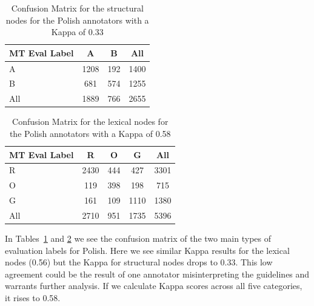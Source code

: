 \documentclass[11pt]{article}
\begin{document}

\begin{table}[h!]
\begin{center}
      \begin{tabular}{|l|cc|c|}
      \hline
\bf{MT Eval Label} & \bf{A} & \bf{B} & \bf{All} \\
\hline                               
    A   & 1208 &  192 & 1400 \\ 
   B   & 681 & 574  & 1255 \\ 
   \hline
   All &  1889 &  766 & 2655 \\
      \hline
    \end{tabular}
\end{center}
\normalsize
\vspace*{-3ex}
\caption{Confusion Matrix for the structural nodes for the Polish annotators with a Kappa of 0.33
}
\label{tab:iaa-ab-pl}
\end{table}

\begin{table}[h!]
\begin{center}
      \begin{tabular}{|l|ccc|c|}
      \hline
\bf{MT Eval Label} & \bf{R} & \bf{O} & \bf{G} & \bf{All} \\
\hline                               
   R   & 2430 &  444 & 427 & 3301 \\ 
   O   & 119 & 398  & 198 & 715 \\ 
   G   & 161 & 109  & 1110 & 1380 \\ 
   \hline
   All &  2710 &  951 & 1735 & 5396 \\
      \hline
    \end{tabular}
\end{center}
\normalsize
\vspace*{-3ex}
\caption{Confusion Matrix for the lexical nodes for the Polish annotators with a Kappa of 0.58
}
\label{tab:iaa-rgo-pl}
\end{table}

In Tables~\ref{tab:iaa-ab-pl} and \ref{tab:iaa-rgo-pl} we see the confusion matrix of
the two main types of evaluation labels for Polish. Here we see similar Kappa results for
the lexical nodes (0.56) but the Kappa for structural nodes drops to 0.33. 
This low agreement could be the result of one annotator misinterpreting the guidelines
and warrants further analysis.
If we calculate Kappa scores across all five categories, it rises to 
0.58. 
\end{document}
